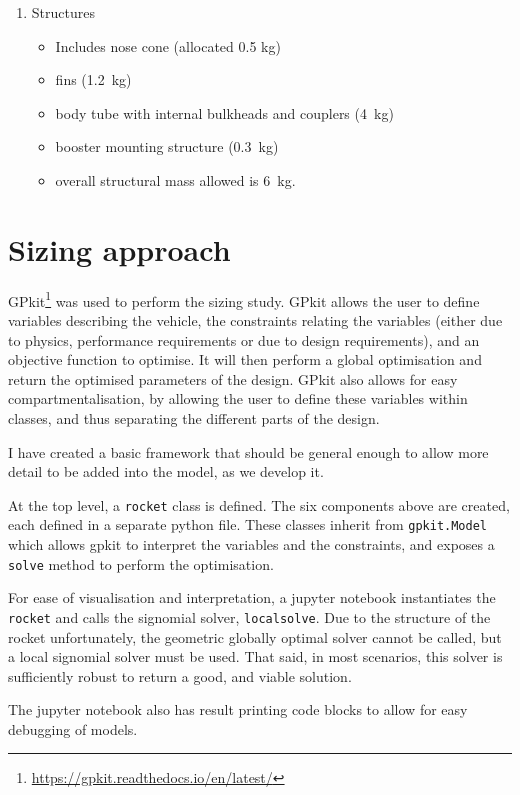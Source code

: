 \documentclass[12pt]{article}
\begin{document}
\begin{enumerate}
\item Structures
\begin{itemize}
\item Includes nose cone (allocated 0.5 kg)
\item fins (1.2~kg)
\item body tube with internal bulkheads and couplers (4~kg)
\item booster mounting structure (0.3~kg)
\item overall structural mass allowed is 6~kg.
\end{itemize}

\end{enumerate}


\section{Sizing approach}

GPkit\footnote{\url{https://gpkit.readthedocs.io/en/latest/}} was used to perform the sizing study. GPkit allows the user to define variables describing the vehicle, the constraints relating the variables (either due to physics, performance requirements or due to design requirements), and an objective function to optimise. It will then perform a global optimisation and return the optimised parameters of the design. GPkit also allows for easy compartmentalisation, by allowing the user to define these variables within classes, and thus separating the different parts of the design. 

I have created a basic framework that should be general enough to allow more detail to be added into the model, as we develop it. 

At the top level, a \texttt{rocket} class is defined. The six components above are created, each defined in a separate python file. These classes inherit from \texttt{gpkit.Model} which allows gpkit to interpret the variables and the constraints, and exposes a \texttt{solve} method to perform the optimisation.

For ease of visualisation and interpretation, a jupyter notebook instantiates the \texttt{rocket} and calls the signomial solver, \texttt{localsolve}. Due to the structure of the rocket unfortunately, the geometric globally optimal solver cannot be called, but a local signomial solver must be used. That said, in most scenarios, this solver is sufficiently robust to return a good, and viable solution. 

The jupyter notebook also has result printing code blocks to allow for easy debugging of models. 
\end{document}
